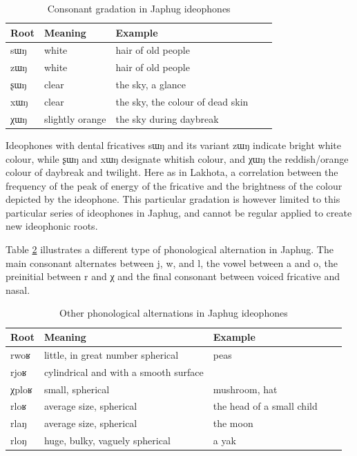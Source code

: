 \documentclass[oldfontcommands,oneside,a4paper,11pt]{article}
\newcommand{\ipa}[1]{{\phon \mbox{#1}}} %
\begin{document}
\begin{table}[h]
\caption{Consonant gradation in Japhug ideophones} \label{tab:gradation.fric} \centering 
\begin{tabular}{lllll}
\toprule
Root& Meaning & Example \\
\midrule
\ipa{sɯŋ}& white & hair of old people \\
\ipa{zɯŋ}&white & hair of old people \\
\ipa{ʂɯŋ}& clear& the sky, a glance\\
\ipa{xɯŋ}& clear& the sky,  the colour of dead skin\\
\ipa{χɯŋ}& slightly orange& the sky during daybreak\\
\bottomrule
\end{tabular}
\end{table}
Ideophones with dental fricatives  \ipa{sɯŋ} and its variant \ipa{zɯŋ} indicate bright white colour, while \ipa{ʂɯŋ} and \ipa{xɯŋ} designate whitish colour, and \ipa{χɯŋ} the reddish/orange colour of daybreak and twilight. Here as in Lakhota, a correlation between the frequency of the peak of energy of the fricative and the brightness of the colour depicted by the ideophone. This particular gradation is however limited to this particular series of ideophones in Japhug, and cannot be regular applied to create new ideophonic roots.

Table \ref{tab:gradation.lateral}  illustrates a different type of phonological alternation in Japhug.   The main consonant alternates between \ipa{j}, \ipa{w}, and \ipa{l},  the vowel between \ipa{a} and \ipa{o}, the preinitial between \ipa{r} and \ipa{χ} and the final consonant between voiced fricative and nasal.

\begin{table}[h]
\caption{Other phonological alternations in Japhug ideophones} \label{tab:gradation.lateral} \centering 
\begin{tabular}{lllll}
\toprule
Root& Meaning & Example \\
\midrule
\ipa{rwoʁ}& little, in great number spherical& peas \\
\ipa{rjoʁ}&cylindrical and with a smooth surface& \\
\ipa{χploʁ}& small, spherical& mushroom, hat\\
\ipa{rloʁ}& average size, spherical& the head of a small child\\
\ipa{rlaŋ}& average size, spherical& the moon\\
\ipa{rloŋ}& huge, bulky, vaguely spherical&a yak\\
\bottomrule
\end{tabular}
\end{table}
\end{document}

